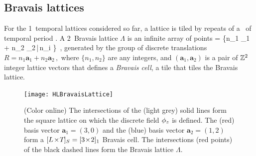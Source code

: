 

\subsection{Bravais lattices}
\label{s:BravaisLatt}

For the 1\dmn\ temporal lattices considered so far,
a lattice is tiled by repeats of a \brick\ of temporal period \period{}.
A 2\dmn\ {Bravais lattice} $\Lambda$ is an infinite array of points
\beq
\Lambda = \{n_1 _1 + n_2 _2\,|\,n_i \in {}\}
\,,
generated by the group of discrete translations
\(
{R} =n_{1}\mathbf{a}_{1}+n_{2}\mathbf{a}_{2}
\,,
\)
where $\{n_{1},n_{2}\}$ are any integers, and
$(\mathbf{a}_{1},\mathbf{a}_{2})$ is a pair of $\mathbb{Z}^2$ integer
lattice vectors that defines a \emph{Bravais cell}, a tile that tiles the
Bravais lattice.

\begin{figure}
  \centering
\texttt{[image: HLBravaisLattice]}
~~~
  \caption{\label{fig:BravaisLatt}
  (Color online)
    The intersections of the (light grey) solid lines form the square
    lattice on which the discrete field $\phi_z$ is defined. The (red)
    basis vector $\mathbf{a}_1=(3,0)$ and the (blue) basis vector
    $\mathbf{a}_2=(1,2)$ form a ${[{L_{}}\!\times\!{T_{}}]_{S_{}}}={[3\!\times\!2]_{1}}$ Bravais
    cell. The intersections (red points) of the black dashed lines form
    the Bravais lattice $\Lambda$.
}
\end{figure}

